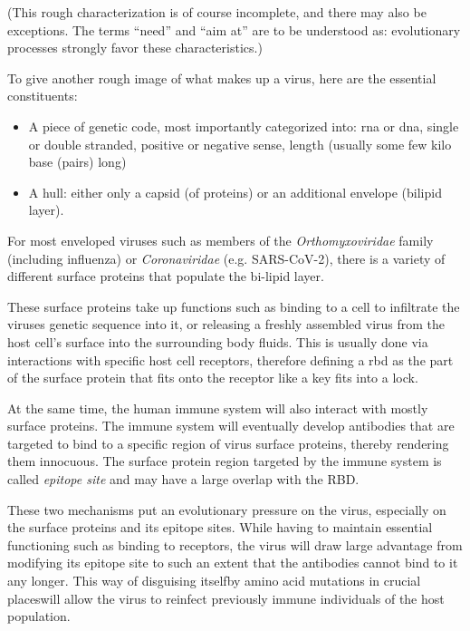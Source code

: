 \documentclass[12pt]{scrartcl}
\begin{document}
    (This rough characterization is of course incomplete, and there may also be exceptions. The terms ``need'' and ``aim at'' are to be understood as: evolutionary processes strongly favor these characteristics.)

    To give another rough image of what makes up a virus, here are the essential constituents:
    \begin{itemize}
      \item A piece of genetic code, most importantly categorized into: \acrfull{rna} or \acrfull{dna}, single or double stranded, positive or negative sense, length (usually some few kilo base (pairs) long)
      \item A hull: either only a capsid (of proteins) or an additional envelope (bilipid layer).
    \end{itemize}

    For most enveloped viruses such as members of the \textit{Orthomyxoviridae} family (including influenza) or \textit{Coronaviridae} (e.g. SARS-CoV-2), there is a variety of different surface proteins that populate the bi-lipid layer.

    These surface proteins take up functions such as binding to a cell to infiltrate the viruses genetic sequence into it, or releasing a freshly assembled virus from the host cell's surface into the surrounding body fluids. This is usually done via interactions with specific host cell receptors, therefore defining a \acrfull{rbd} as the part of the surface protein that fits onto the receptor like a key fits into a lock.

    At the same time, the human immune system will also interact with mostly surface proteins. The immune system will eventually develop antibodies that are targeted to bind to a specific region of virus surface proteins, thereby rendering them innocuous. The surface protein region targeted by the immune system is called \textit{epitope site} and may have a large overlap with the RBD.

    These two mechanisms put an evolutionary pressure on the virus, especially on the surface proteins and its epitope sites. While having to maintain essential functioning such as binding to receptors, the virus will draw large advantage from modifying its epitope site to such an extent that the antibodies cannot bind to it any longer. This way of disguising itself\textemdash by amino acid mutations in crucial places\textemdash will allow the virus to reinfect previously immune individuals of the host population.
\end{document}
